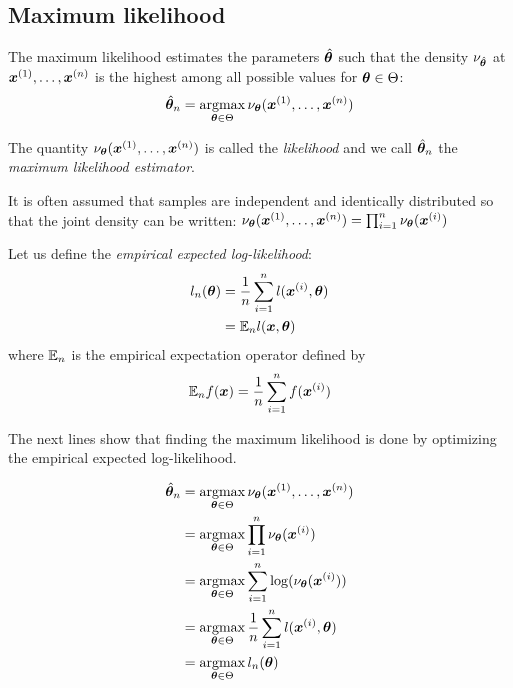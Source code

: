 \subsection{Maximum likelihood}
\label{sec:mlintro}
The maximum likelihood estimates the parameters $\hat{\boldsymbol{\theta}}$ such that the
density $\nu_{\hat{\boldsymbol{\theta}}}$ at $\boldsymbol{x}^{(1)}, \dots, \boldsymbol{x}^{(n)}$ is the highest among all possible
values for $\boldsymbol{\theta} \in \Theta$:
\begin{align}
  \hat{\boldsymbol{\theta}}_n = \operatorname*{argmax}_{\boldsymbol{\theta} \in \Theta} \nu_{\boldsymbol{\theta}}(\boldsymbol{x}^{(1)}, \dots, \boldsymbol{x}^{(n)})
\end{align}

The quantity $\nu_{\boldsymbol{\theta}}(\boldsymbol{x}^{(1)}, \dots, \boldsymbol{x}^{(n)})$ is called the
\emph{likelihood} and we call $\hat{\boldsymbol{\theta}}_n$ the \emph{maximum likelihood estimator}.

It is often assumed that samples are independent and identically distributed so that
the joint density can be written:
$\nu_{\boldsymbol{\theta}}(\boldsymbol{x}^{(1)}, \dots, \boldsymbol{x}^{(n)}) = \prod_{i=1}^n \nu_{\boldsymbol{\theta}}(\boldsymbol{x}^{(i)})$

Let us define the \emph{empirical expected log-likelihood}:
\begin{align}
  l_n(\boldsymbol{\theta}) &= \frac1n
  \sum_{i=1}^n l(\boldsymbol{x}^{(i)}, \boldsymbol{\theta}) \\
               &= \mathbb{E}_n l(\boldsymbol{x}, \boldsymbol{\theta})
\end{align}
where $\mathbb{E}_n$ is the empirical expectation operator defined by
\begin{align}
\mathbb{E}_n f(\boldsymbol{x}) = \frac1{n} \sum_{i=1}^n f(\boldsymbol{x}^{(i)})
\end{align}


The next lines show that finding the maximum likelihood is done by optimizing
the empirical expected log-likelihood.


\begin{align}
  \hat{\boldsymbol{\theta}}_n &= \operatorname*{argmax}_{\boldsymbol{\theta} \in \Theta} \nu_{\boldsymbol{\theta}}(\boldsymbol{x}^{(1)}, \dots, \boldsymbol{x}^{(n)}) \\
               &= \operatorname*{argmax}_{\boldsymbol{\theta} \in \Theta} \prod_{i=1}^n \nu_{\boldsymbol{\theta}}(\boldsymbol{x}^{(i)}) \\ 
               &= \operatorname*{argmax}_{\boldsymbol{\theta} \in \Theta} \sum_{i=1}^n \log(\nu_{\boldsymbol{\theta}}(\boldsymbol{x}^{(i)}))  \\
               &= \operatorname*{argmax}_{\boldsymbol{\theta} \in \Theta} \frac1n \sum_{i=1}^n l(\boldsymbol{x}^{(i)}, \boldsymbol{\theta}) \\ 
                  &= \operatorname*{argmax}_{\boldsymbol{\theta} \in \Theta} l_n(\boldsymbol{\theta}) \\ 
\end{align}

